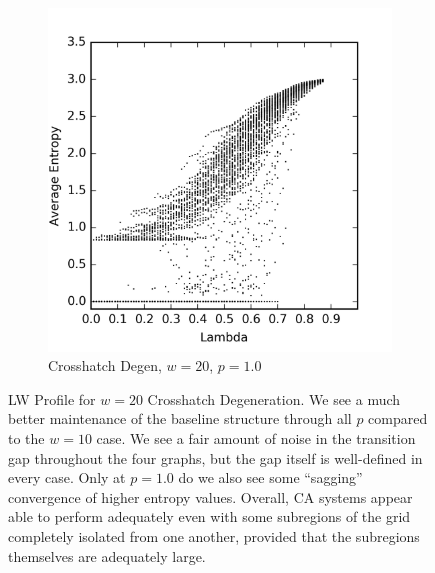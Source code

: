 \documentclass[a4paper,11pt]{article}
\begin{document}
\begin{figure}[htp]
\begin{subfigure}[t]{0.4\textwidth}
  \end{subfigure}
~
\begin{subfigure}[t]{0.4\textwidth}
  \centering
  \includegraphics[width=\textwidth]{ch6_figs/ch_w20_p100_entropy_scatter}
  \caption{Crosshatch Degen, $w=20$, $p=1.0$}
  \label{fig:lw_w20_p100}
  \end{subfigure}

\caption[Crosshatch Langton-Wootters Profile, $w=20$]{
  LW Profile for $w=20$ Crosshatch Degeneration. We see a much better maintenance of the baseline structure through all $p$ compared to the $w=10$ case. We see a fair amount of noise in the transition gap throughout the four graphs, but the gap itself is well-defined in every case. Only at $p=1.0$ do we also see some ``sagging'' convergence of higher entropy values. Overall, CA systems appear able to perform adequately even with some subregions of the grid completely isolated from one another, provided that the subregions themselves are adequately large.
}
\label{fig:lw_ch_20}
\end{figure}
\end{document}
